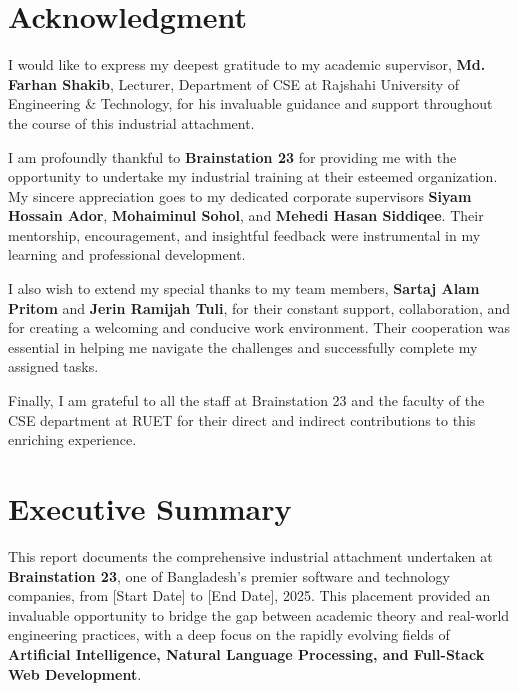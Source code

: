 \documentclass[12pt,a4paper]{article}
\begin{document}
\newpage

\section*{Acknowledgment}
\label{sec:acknowledgment}
\vspace{3em}
I would like to express my deepest gratitude to my academic supervisor, \textbf{Md. Farhan Shakib}, Lecturer, Department of CSE at Rajshahi University of Engineering \& Technology, for his invaluable guidance and support throughout the course of this industrial attachment.

I am profoundly thankful to \textbf{Brainstation 23} for providing me with the opportunity to undertake my industrial training at their esteemed organization. My sincere appreciation goes to my dedicated corporate supervisors \textbf{Siyam Hossain Ador}, \textbf{Mohaiminul Sohol}, and \textbf{Mehedi Hasan Siddiqee}. Their mentorship, encouragement, and insightful feedback were instrumental in my learning and professional development.

I also wish to extend my special thanks to my team members, \textbf{Sartaj Alam Pritom} and \textbf{Jerin Ramijah Tuli}, for their constant support, collaboration, and for creating a welcoming and conducive work environment. Their cooperation was essential in helping me navigate the challenges and successfully complete my assigned tasks.

Finally, I am grateful to all the staff at Brainstation 23 and the faculty of the CSE department at RUET for their direct and indirect contributions to this enriching experience.

\newpage

\section*{Executive Summary}
\label{sec:executive-summary}

This report documents the comprehensive industrial attachment undertaken at \textbf{Brainstation 23}, one of Bangladesh's premier software and technology companies, from [Start Date] to [End Date], 2025. This placement provided an invaluable opportunity to bridge the gap between academic theory and real-world engineering practices, with a deep focus on the rapidly evolving fields of \textbf{Artificial Intelligence, Natural Language Processing, and Full-Stack Web Development}.
\end{document}
